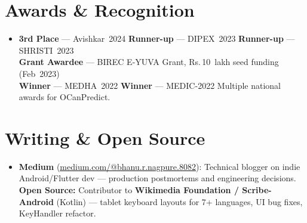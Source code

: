 \documentclass[letterpaper,11pt]{article}
\newcommand{\resumeSubHeadingListStart}{
  \begin{itemize}[leftmargin=0.13in, label={}, itemsep=2pt, parsep=0pt]
}
\newcommand{\resumeSubHeadingListEnd}{\end{itemize}}
\begin{document}
\section{Awards \& Recognition}

\resumeSubHeadingListStart
  \item\small{
    \textbf{3rd Place} — Avishkar~2024 \quad \textbf{Runner-up} — DIPEX~2023 \quad \textbf{Runner-up} — SHRISTI~2023 \\[2pt]
    \textbf{Grant Awardee} — BIREC E-YUVA Grant, Rs.\,10~lakh seed funding (Feb~2023) \\[2pt]
    \textbf{Winner} — MEDHA~2022 \quad \textbf{Winner} — MEDIC-2022 \quad Multiple national awards for OCanPredict.
  }
\resumeSubHeadingListEnd

\section{Writing \& Open Source}

\resumeSubHeadingListStart
  \item\small{
    \textbf{Medium} (\href{https://medium.com/@bhanu.r.nagpure.8082}{\underline{medium.com/@bhanu.r.nagpure.8082}}): Technical blogger on indie Android/Flutter dev — production postmortems and engineering decisions. \\[2pt]
    \textbf{Open Source:} Contributor to \textbf{Wikimedia Foundation / Scribe-Android} (Kotlin) — tablet keyboard layouts for 7+ languages, UI bug fixes, KeyHandler refactor.
  }
\resumeSubHeadingListEnd
\end{document}
